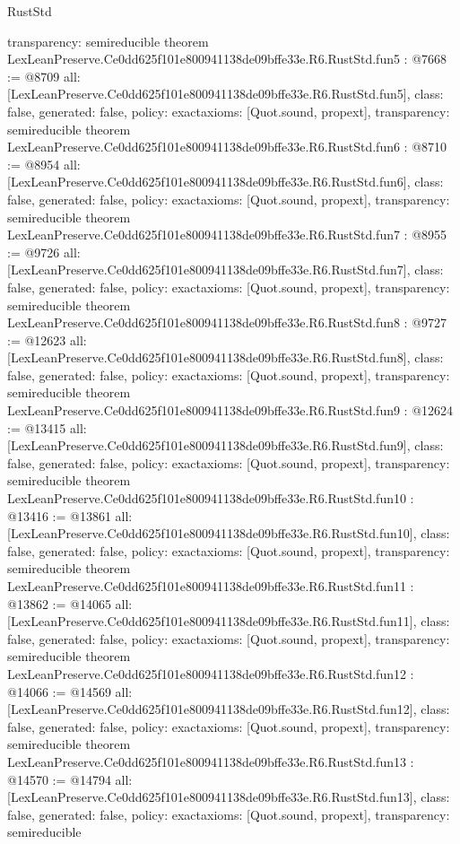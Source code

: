 \begin{lexlean}{RustStd}
\begin{coremodule}
{  transparency: semireducible
}
theorem LexLeanPreserve.Ce0dd625f101e800941138de09bffe33e.R6.RustStd.fun5 : @7668 := @8709 {
  all: [LexLeanPreserve.Ce0dd625f101e800941138de09bffe33e.R6.RustStd.fun5],
  class: false,
  generated: false,
  policy: exact{axioms: [Quot.sound, propext]},
  transparency: semireducible
}
theorem LexLeanPreserve.Ce0dd625f101e800941138de09bffe33e.R6.RustStd.fun6 : @8710 := @8954 {
  all: [LexLeanPreserve.Ce0dd625f101e800941138de09bffe33e.R6.RustStd.fun6],
  class: false,
  generated: false,
  policy: exact{axioms: [Quot.sound, propext]},
  transparency: semireducible
}
theorem LexLeanPreserve.Ce0dd625f101e800941138de09bffe33e.R6.RustStd.fun7 : @8955 := @9726 {
  all: [LexLeanPreserve.Ce0dd625f101e800941138de09bffe33e.R6.RustStd.fun7],
  class: false,
  generated: false,
  policy: exact{axioms: [Quot.sound, propext]},
  transparency: semireducible
}
theorem LexLeanPreserve.Ce0dd625f101e800941138de09bffe33e.R6.RustStd.fun8 : @9727 := @12623 {
  all: [LexLeanPreserve.Ce0dd625f101e800941138de09bffe33e.R6.RustStd.fun8],
  class: false,
  generated: false,
  policy: exact{axioms: [Quot.sound, propext]},
  transparency: semireducible
}
theorem LexLeanPreserve.Ce0dd625f101e800941138de09bffe33e.R6.RustStd.fun9 : @12624 := @13415 {
  all: [LexLeanPreserve.Ce0dd625f101e800941138de09bffe33e.R6.RustStd.fun9],
  class: false,
  generated: false,
  policy: exact{axioms: [Quot.sound, propext]},
  transparency: semireducible
}
theorem LexLeanPreserve.Ce0dd625f101e800941138de09bffe33e.R6.RustStd.fun10 : @13416 := @13861 {
  all: [LexLeanPreserve.Ce0dd625f101e800941138de09bffe33e.R6.RustStd.fun10],
  class: false,
  generated: false,
  policy: exact{axioms: [Quot.sound, propext]},
  transparency: semireducible
}
theorem LexLeanPreserve.Ce0dd625f101e800941138de09bffe33e.R6.RustStd.fun11 : @13862 := @14065 {
  all: [LexLeanPreserve.Ce0dd625f101e800941138de09bffe33e.R6.RustStd.fun11],
  class: false,
  generated: false,
  policy: exact{axioms: [Quot.sound, propext]},
  transparency: semireducible
}
theorem LexLeanPreserve.Ce0dd625f101e800941138de09bffe33e.R6.RustStd.fun12 : @14066 := @14569 {
  all: [LexLeanPreserve.Ce0dd625f101e800941138de09bffe33e.R6.RustStd.fun12],
  class: false,
  generated: false,
  policy: exact{axioms: [Quot.sound, propext]},
  transparency: semireducible
}
theorem LexLeanPreserve.Ce0dd625f101e800941138de09bffe33e.R6.RustStd.fun13 : @14570 := @14794 {
  all: [LexLeanPreserve.Ce0dd625f101e800941138de09bffe33e.R6.RustStd.fun13],
  class: false,
  generated: false,
  policy: exact{axioms: [Quot.sound, propext]},
  transparency: semireducible
}
\end{coremodule}
\end{lexlean}
